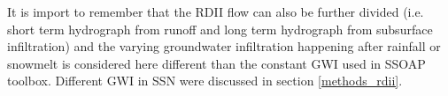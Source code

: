 It is import to remember that the RDII flow can also be further divided (i.e. short term hydrograph from runoff and long term hydrograph from subsurface infiltration) and the varying groundwater infiltration happening after rainfall or snowmelt is considered here different than the constant GWI used in SSOAP toolbox. Different GWI in \ac{SSN} were discussed in section \ref{methods_rdii}. 













    
    







